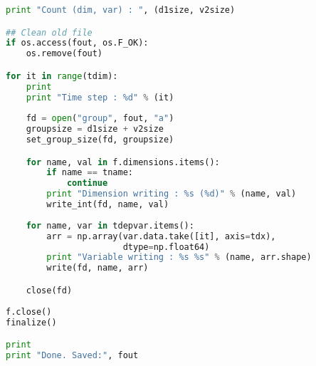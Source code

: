 \begin{lstlisting}[language=python,frame=single, backgroundcolor=\color{gray85},caption={ncdf2bp.py. An example Python/Numpy wrapper code for converting a NetCDF file to a ADIOS BP file},label={},]
print "Count (dim, var) : ", (d1size, v2size)

## Clean old file
if os.access(fout, os.F_OK):
    os.remove(fout)

for it in range(tdim):
    print 
    print "Time step : %d" % (it)
    
    fd = open("group", fout, "a")
    groupsize = d1size + v2size
    set_group_size(fd, groupsize)

    for name, val in f.dimensions.items():
        if name == tname:
            continue
        print "Dimension writing : %s (%d)" % (name, val)
        write_int(fd, name, val)
        
    for name, var in tdepvar.items():
        arr = np.array(var.data.take([it], axis=tdx),
                       dtype=np.float64)
        print "Variable writing : %s %s" % (name, arr.shape)
        write(fd, name, arr)

    close(fd)
    
f.close()
finalize()

print
print "Done. Saved:", fout
\end{lstlisting}



